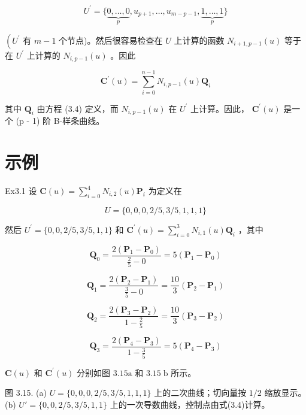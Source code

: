 \documentclass[../main.tex]{subfiles}
\begin{document}
\[
{U}^{\prime } = \{ \underset{p}{\underbrace{0,\ldots ,0}},{u}_{p + 1},\ldots ,{u}_{m - p - 1},\underset{p}{\underbrace{1,\ldots ,1}}\}  \tag{3.5}
\]

\(\left( {U}^{\prime }\right.\) 有 \(m - 1\) 个节点)。然后很容易检查在 \(U\) 上计算的函数 \({N}_{i + 1,p - 1}\left( u\right)\) 等于在 \({U}^{\prime }\) 上计算的 \({N}_{i,p - 1}\left( u\right)\) 。因此

\[
{\mathbf{C}}^{\prime }\left( u\right)  = \mathop{\sum }\limits_{{i = 0}}^{{n - 1}}{N}_{i,p - 1}\left( u\right) {\mathbf{Q}}_{i} \tag{3.6}
\]

其中 \({\mathbf{Q}}_{i}\) 由方程 (3.4) 定义，而 \({N}_{i,p - 1}\left( u\right)\) 在 \({U}^{\prime }\) 上计算。因此， \({\mathbf{C}}^{\prime }\left( u\right)\) 是一个 (p - 1) 阶 B-样条曲线。

\section*{示例}

Ex3.1 设 \(\mathbf{C}\left( u\right)  = \mathop{\sum }\limits_{{i = 0}}^{4}{N}_{i,2}\left( u\right) {\mathbf{P}}_{i}\) 为定义在

\[
U = \{ 0,0,0,2/5,3/5,1,1,1\}
\]

然后 \({U}^{\prime } = \{ 0,0,2/5,3/5,1,1\}\) 和 \({\mathbf{C}}^{\prime }\left( u\right)  = \mathop{\sum }\limits_{{i = 0}}^{3}{N}_{i,1}\left( u\right) {\mathbf{Q}}_{i}\) ，其中

\[
\mathbf Q_{0}=\frac{2\left(\mathbf P_{1}-\mathbf P_{0}\right)}{\frac25-0}=5\left(\mathbf P_{1}-\mathbf P_{0}\right)
\]

\[
\mathbf Q_{1}=\frac{2\left(\mathbf P_{2}-\mathbf P_{1}\right)}{\frac35-0}=\frac{10}{3}\left(\mathbf P_{2}-\mathbf P_{1}\right)
\]

\[
\mathbf Q_{2}=\frac{2\left(\mathbf P_{3}-\mathbf P_{2}\right)}{1-\frac25}=\frac{10}{3}\left(\mathbf P_{3}-\mathbf P_{2}\right)
\]

\[
\mathbf Q_{3}=\frac{2\left(\mathbf P_{4}-\mathbf P_{3}\right)}{1-\frac35}=5\left(\mathbf P_{4}-\mathbf P_{3}\right)
\]

\(\mathbf{C}\left( u\right)\) 和 \({\mathbf{C}}^{\prime }\left( u\right)\) 分别如图 \({3.15}\mathrm{a}\) 和 \({3.15}\mathrm{\;b}\) 所示。

\begin{center}
\begin{minipage}{18cm}
\vspace*{.6\baselineskip}
\centering
{}
\par\smallskip
图 3.15. (a) \(U=\{0,0,0,2/5,3/5,1,1,1\}\) 上的二次曲线；切向量按 \(1/2\) 缩放显示。\\ (b) \(U'=\{0,0,2/5,3/5,1,1\}\) 上的一次导数曲线，控制点由式(3.4)计算。
\end{minipage}
\end{center}
\end{document}
